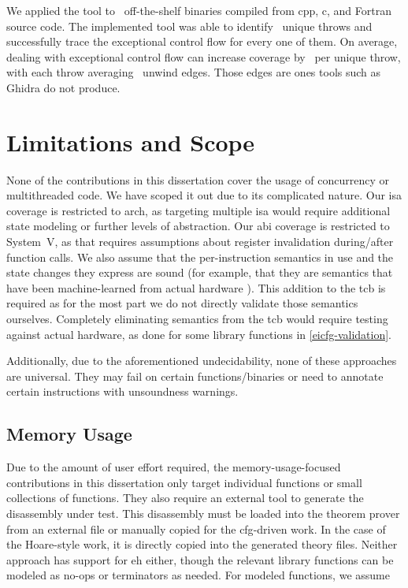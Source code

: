 We applied the tool to \totalbins\ off-the-shelf binaries compiled from \gls{cpp}, \gls{c}, and Fortran source code.
The implemented tool was able to identify \uniquethrows\ unique throws and successfully trace the exceptional control flow for every one of them.
On average, dealing with exceptional control flow can increase coverage by \avgdiffinst\ per unique throw, with each throw averaging \avgunwinds\ unwind edges.
Those edges are ones tools such as Ghidra \autocite{ghidra} do not produce.

\section{Limitations and Scope}
None of the contributions in this dissertation cover the usage of concurrency or multithreaded code.
We have scoped it out due to its complicated nature.
Our \ac{isa} coverage is restricted to \gls{arch}, as targeting multiple \ac{isa} would require additional state modeling or further levels of abstraction.
Our \ac{abi} coverage is restricted to System~V, as that requires assumptions about register invalidation during/after function calls.
We also assume that the per-instruction semantics in use and the state changes they express are sound (for example, that they are semantics that have been machine-learned from actual hardware \autocite{heule2016stratified,roessle2019formally}).
This addition to the \ac{tcb} is required as for the most part we do not directly validate those semantics ourselves.
Completely eliminating semantics from the \ac{tcb} would require testing against actual hardware, as done for some library functions in \cref{eicfg-validation}.

Additionally, due to the aforementioned undecidability, none of these approaches are universal.
They may fail on certain functions/binaries or need to annotate certain instructions with unsoundness warnings.

\subsection{Memory Usage}
Due to the amount of user effort required, the memory-usage-focused contributions in this dissertation only target individual functions or small collections of functions.
They also require an external tool to generate the disassembly under test.
This disassembly must be loaded into the theorem prover from an external file or manually copied for the \ac{cfg}-driven work.
In the case of the Hoare-style work, it is directly copied into the generated theory files.
Neither approach has support for \ac{eh} either, though the relevant library functions can be modeled as no-ops or terminators as needed.
For modeled functions, we assume

